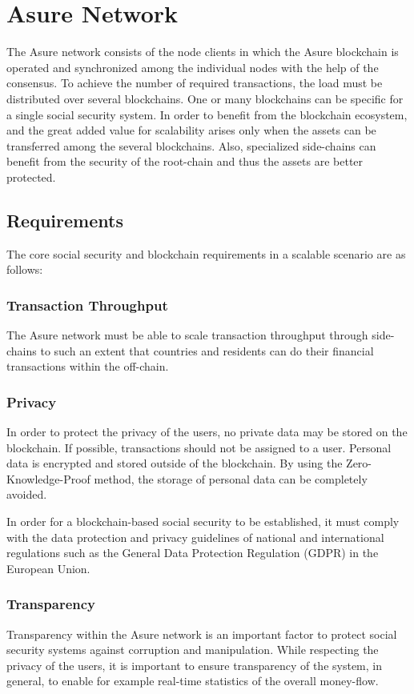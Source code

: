 \section{Asure Network}

The Asure network consists of the node clients in which the Asure blockchain is operated and synchronized among the individual nodes with the help of the consensus. To achieve the number of required transactions, the load must be distributed over several blockchains. One or many blockchains can be specific for a single social security system.  In order to benefit from the blockchain ecosystem, and the great added value for scalability arises only when the assets can be transferred among the several blockchains. Also, specialized side-chains can benefit from the security of the root-chain and thus the assets are better protected. \cite{omisego}

\subsection{Requirements}
The core social security and blockchain requirements in a scalable scenario are as follows:

\subsubsection*{Transaction Throughput}
The Asure network must be able to scale transaction throughput through side-chains to such an extent that countries and residents can do their financial transactions within the off-chain.

\subsubsection*{Privacy}
In order to protect the privacy of the users, no private data may be stored on the blockchain. If possible, transactions should not be assigned to a user. Personal data is encrypted and stored outside of the blockchain. By using the Zero-Knowledge-Proof method, the storage of personal data can be completely avoided. 

In order for a blockchain-based social security to be established, it must comply with the data protection and privacy guidelines of national and international regulations such as the General Data Protection Regulation (GDPR) in the European Union. \cite{gdpr}

\subsubsection*{Transparency}
Transparency within the Asure network is an important factor to protect social security systems against corruption and manipulation. While respecting the privacy of the users, it is important to ensure transparency of the system, in general, to enable for example real-time statistics of the overall money-flow.

